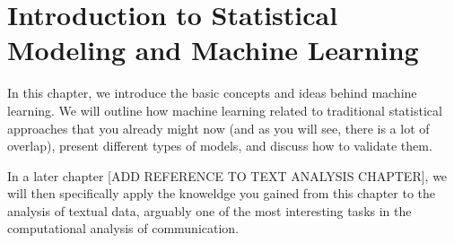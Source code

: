 \chapter{Introduction to Statistical Modeling and Machine Learning}

In this chapter, we introduce the basic concepts and ideas behind machine learning.
We will outline how machine learning related to traditional statistical approaches that you already might now (and as you will see, there is a lot of overlap), present different types of models, and discuss how to validate them.

In a later chapter [ADD REFERENCE TO TEXT ANALYSIS CHAPTER], we will then specifically apply the knoweldge you gained from this chapter to the analysis of textual data, arguably one of the most interesting tasks in the computational analysis of communication.









